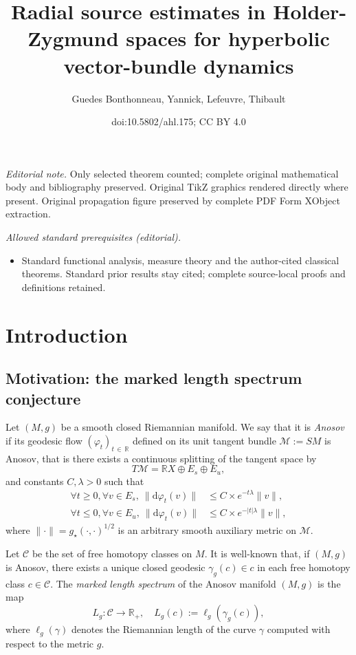 \documentclass[10pt]{amsart}
\title{Radial source estimates in Holder-Zygmund spaces for hyperbolic vector-bundle dynamics}
\author{Guedes Bonthonneau, Yannick, Lefeuvre, Thibault}
\date{doi:10.5802/ahl.175; CC BY 4.0}
\theoremstyle{definition}\newtheorem{defi}[theo]{Definition}\newtheorem{rema}[theo]{Remark}\newtheorem{exam}[theo]{Example}\newtheorem{exem}[theo]{Example}\newtheorem{nota}[theo]{Notation}
\newcommand{\R}{\mathbb{R}}
\newcommand{\mc}{\mathcal}
\newcommand{\M}{\mathcal{M}}
\newcommand{\dd}{\mathrm{d}}
\let\oldforall\forall
\renewcommand*{\forall}{\mathrel{\oldforall}}
\begin{document}
\maketitle
\noindent\textit{Editorial note.} Only selected theorem counted; complete original mathematical body and bibliography preserved. Original TikZ graphics rendered directly where present. Original propagation figure preserved by complete PDF Form XObject extraction.\par\medskip
\noindent\textit{Allowed standard prerequisites (editorial).}\begin{itemize}
\item Standard functional analysis, measure theory and the author-cited classical theorems. Standard prior results stay cited; complete source-local proofs and definitions retained.
\end{itemize}\medskip



\section{Introduction}

\subsection{Motivation: the marked length spectrum conjecture}

Let $(M,g)$ be a smooth closed Riemannian manifold. We say that it is \emph{Anosov} if its geodesic flow $(\varphi_t)_{t\,\in\,\R}$ defined on its unit tangent bundle $\M := SM$ is Anosov, that is there exists a continuous splitting of the tangent space by
\[
T\M = \R X \oplus E_s \oplus E_u,
\]
and constants $C,\lambda>0$ such that
\begin{equation}\label{equation:anosov}
\begin{split}
\forall t \geq 0, \forall v \in E_s, \ \|\dd\varphi_t(v)\| &\leq C\times e^{-t\lambda}\|v\|, \\
\forall t \leq 0, \forall v \in E_u, \ \|\dd\varphi_t(v)\| &\leq C\times e^{-|t|\lambda}\|v\|,
\end{split}
\end{equation}
where $\| \cdot \| = g_\star(\cdot,\cdot)^{1/2}$ is an arbitrary smooth auxiliary metric on $\M$.

Let $\mc{C}$ be the set of free homotopy classes on $M$. It is well-known that, if $(M,g)$ is Anosov, there exists a unique closed geodesic $\gamma_g(c) \in c$ in each free homotopy class $c \in \mc{C}$. The \emph{marked length spectrum} of the Anosov manifold $(M,g)$ is the map
\begin{equation}\label{equation:mls}
L_g : \mc{C} \rightarrow \R_+,\quad L_g(c) := \ell_g\left(\gamma_g(c)\right),
\end{equation}
where $\ell_g(\gamma)$ denotes the Riemannian length of the curve $\gamma$ computed with respect to the metric $g$.
\end{document}
